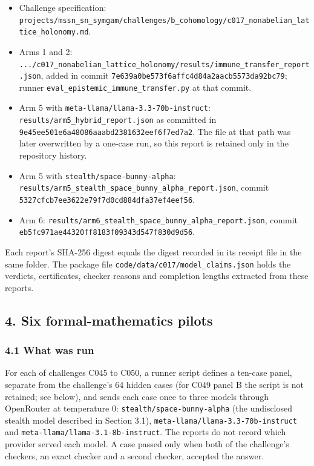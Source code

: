 \documentclass[
  11pt,
]{article}
\providecommand{\tightlist}{%
  \setlength{\itemsep}{0pt}\setlength{\parskip}{0pt}}
\begin{document}
\begin{itemize}
\tightlist
\item
  Challenge specification:
  \nolinkurl{projects/mssn_sn_symgam/challenges/b_cohomology/c017_nonabelian_lattice_holonomy.md}.
\item
  Arms 1 and 2:
  \nolinkurl{.../c017_nonabelian_lattice_holonomy/results/immune_transfer_report.json},
  added in commit \nolinkurl{7e639a0be573f6affc4d84a2aacb5573da92bc79};
  runner \nolinkurl{eval_epistemic_immune_transfer.py} at that commit.
\item
  Arm 5 with \nolinkurl{meta-llama/llama-3.3-70b-instruct}:
  \nolinkurl{results/arm5_hybrid_report.json} as committed in
  \nolinkurl{9e45ee501e6a48086aaabd2381632eef6f7ed7a2}. The file at that
  path was later overwritten by a one-case run, so this report is
  retained only in the repository history.
\item
  Arm 5 with \nolinkurl{stealth/space-bunny-alpha}:
  \nolinkurl{results/arm5_stealth_space_bunny_alpha_report.json}, commit
  \nolinkurl{5327cfcb7ee3622e79f7d0cd884dfa37ef4eef56}.
\item
  Arm 6: \nolinkurl{results/arm6_stealth_space_bunny_alpha_report.json},
  commit \nolinkurl{eb5fc971ae44320ff8183f09343d547f830d9d56}.
\end{itemize}

Each report's SHA-256 digest equals the digest recorded in its receipt
file in the same folder. The package file
\nolinkurl{code/data/c017/model_claims.json} holds the verdicts,
certificates, checker reasons and completion lengths extracted from
these reports.

\subsection{4. Six formal-mathematics
pilots}\label{six-formal-mathematics-pilots}

\subsubsection{4.1 What was run}\label{what-was-run-1}

For each of challenges C045 to C050, a runner script defines a ten-case
panel, separate from the challenge's 64 hidden cases (for C049 panel B
the script is not retained; see below), and sends each case once to
three models through OpenRouter at temperature 0:
\nolinkurl{stealth/space-bunny-alpha} (the undisclosed stealth model
described in Section 3.1), \nolinkurl{meta-llama/llama-3.3-70b-instruct}
and \nolinkurl{meta-llama/llama-3.1-8b-instruct}. The reports do not
record which provider served each model. A case passed only when both of
the challenge's checkers, an exact checker and a second checker,
accepted the answer.
\end{document}

